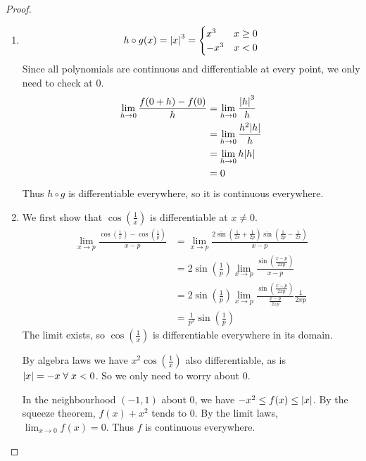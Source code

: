 \documentclass[12pt]{article}
\begin{document}
\begin{proof} \leavevmode
    \begin{enumerate}[label=(\alph*)]
        \item \[
            h \circ g (x) = \abs{x}^{3} =
            \begin{cases}
                x^{3} & x \geq 0 \\
                -x^{3} & x < 0
            \end{cases}
        \] Since all polynomials are continuous and differentiable at every point, we only need to check at 0.
        \begin{align*}
            \lim_{h \to 0} \frac{f(0 + h) - f(0)}{h} &= \lim_{h \to 0} \frac{\abs{h}^{3}}{h} \\
            &= \lim_{h \to 0} \frac{h^{2}\abs{h}}{h} \\
            &= \lim_{h \to 0} h \abs{h} \\
            &= 0
        \end{align*}
        Thus $h \circ g$ is differentiable everywhere, so it is continuous everywhere.
    
        \item We first show that $\cos(\frac{1}{x})$ is differentiable at $x \neq 0$.
        \begin{align*}
            \lim_{x \to p} \frac{\cos(\frac{1}{x}) - \cos(\frac{1}{p})}{x - p} &= \lim_{x \to p} \frac{2 \sin(\frac{1}{2x} + \frac{1}{2p})\sin(\frac{1}{2p} - \frac{1}{2x})}{x - p} \\
            &= 2 \sin(\frac{1}{p}) \lim_{x \to p} \frac{\sin(\frac{x - p}{2xp})}{x - p} \\
            &= 2 \sin(\frac{1}{p}) \lim_{x \to p} \frac{\sin(\frac{x - p}{2xp})}{\frac{x - p}{2xp}} \frac{1}{2xp} \\
            &= \frac{1}{p^{2}} \sin(\frac{1}{p})
        \end{align*}
        The limit exists, so $\cos(\frac{1}{x})$ is differentiable everywhere in its domain.
    
        By algebra laws we have $x^{2} \cos(\frac{1}{x})$ also differentiable, as is $\abs{x} = -x \;\forall\; x < 0$.
        So we only need to worry about 0.
    
        In the neighbourhood $(-1, 1)$ about 0, we have $-x^{2} \leq f(x) \leq \abs{x}$.
        By the squeeze theorem, $f(x) + x^{2}$ tends to 0.
        By the limit laws, $\lim_{x \to 0} f(x) = 0$.
        Thus $f$ is continuous everywhere.
    

\end{enumerate}
\end{proof}
\end{document}
